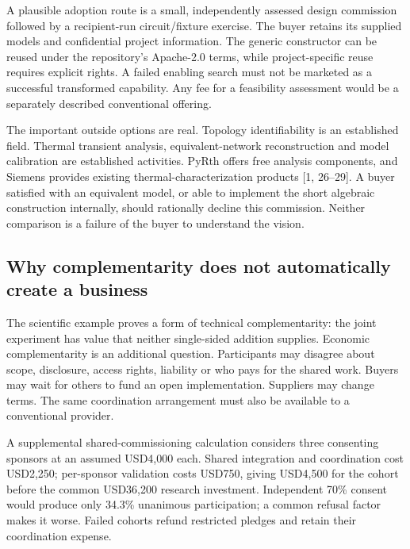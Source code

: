 \documentclass[
  11pt,
]{article}
\begin{document}
A plausible adoption route is a small, independently assessed design
commission followed by a recipient-run circuit/fixture exercise. The
buyer retains its supplied models and confidential project information.
The generic constructor can be reused under the repository's Apache-2.0
terms, while project-specific reuse requires explicit rights. A failed
enabling search must not be marketed as a successful transformed
capability. Any fee for a feasibility assessment would be a separately
described conventional offering.

The important outside options are real. Topology identifiability is an
established field. Thermal transient analysis, equivalent-network
reconstruction and model calibration are established activities. PyRth
offers free analysis components, and Siemens provides existing
thermal-characterization products {[}1, 26--29{]}. A buyer satisfied
with an equivalent model, or able to implement the short algebraic
construction internally, should rationally decline this commission.
Neither comparison is a failure of the buyer to understand the vision.

\hypertarget{why-complementarity-does-not-automatically-create-a-business}{%
\subsection{Why complementarity does not automatically create a
business}\label{why-complementarity-does-not-automatically-create-a-business}}

The scientific example proves a form of technical complementarity: the
joint experiment has value that neither single-sided addition supplies.
Economic complementarity is an additional question. Participants may
disagree about scope, disclosure, access rights, liability or who pays
for the shared work. Buyers may wait for others to fund an open
implementation. Suppliers may change terms. The same coordination
arrangement must also be available to a conventional provider.

A supplemental shared-commissioning calculation considers three
consenting sponsors at an assumed USD4,000 each. Shared integration and
coordination cost USD2,250; per-sponsor validation costs USD750, giving
USD4,500 for the cohort before the common USD36,200 research investment.
Independent 70\% consent would produce only 34.3\% unanimous
participation; a common refusal factor makes it worse. Failed cohorts
refund restricted pledges and retain their coordination expense.
\end{document}
